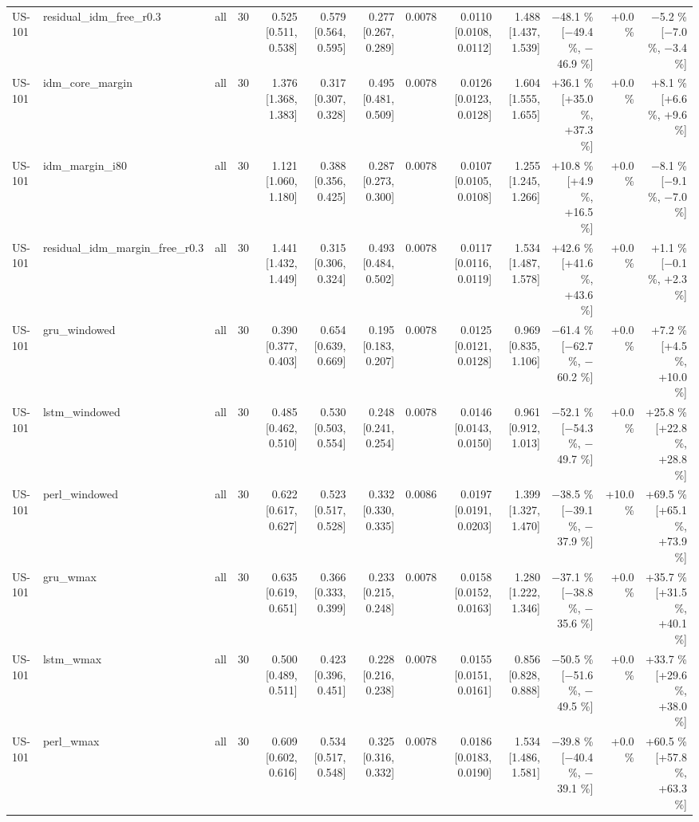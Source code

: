 \begin{table}[htbp]
{\begin{tabular}{lllrrrrrrrrrr}
US-101 & residual\_idm\_free\_r0.3 & all & 30 & 0.525 [0.511, 0.538] & 0.579 [0.564, 0.595] & 0.277 [0.267, 0.289] & 0.0078 & 0.0110 [0.0108, 0.0112] & 1.488 [1.437, 1.539] & $-$48.1 \% [$-$49.4 \%, $-$46.9 \%] & +0.0 \% & $-$5.2 \% [$-$7.0 \%, $-$3.4 \%] \\
US-101 & idm\_core\_margin & all & 30 & 1.376 [1.368, 1.383] & 0.317 [0.307, 0.328] & 0.495 [0.481, 0.509] & 0.0078 & 0.0126 [0.0123, 0.0128] & 1.604 [1.555, 1.655] & +36.1 \% [+35.0 \%, +37.3 \%] & +0.0 \% & +8.1 \% [+6.6 \%, +9.6 \%] \\
US-101 & idm\_margin\_i80 & all & 30 & 1.121 [1.060, 1.180] & 0.388 [0.356, 0.425] & 0.287 [0.273, 0.300] & 0.0078 & 0.0107 [0.0105, 0.0108] & 1.255 [1.245, 1.266] & +10.8 \% [+4.9 \%, +16.5 \%] & +0.0 \% & $-$8.1 \% [$-$9.1 \%, $-$7.0 \%] \\
US-101 & residual\_idm\_margin\_free\_r0.3 & all & 30 & 1.441 [1.432, 1.449] & 0.315 [0.306, 0.324] & 0.493 [0.484, 0.502] & 0.0078 & 0.0117 [0.0116, 0.0119] & 1.534 [1.487, 1.578] & +42.6 \% [+41.6 \%, +43.6 \%] & +0.0 \% & +1.1 \% [$-$0.1 \%, +2.3 \%] \\
US-101 & gru\_windowed & all & 30 & 0.390 [0.377, 0.403] & 0.654 [0.639, 0.669] & 0.195 [0.183, 0.207] & 0.0078 & 0.0125 [0.0121, 0.0128] & 0.969 [0.835, 1.106] & $-$61.4 \% [$-$62.7 \%, $-$60.2 \%] & +0.0 \% & +7.2 \% [+4.5 \%, +10.0 \%] \\
US-101 & lstm\_windowed & all & 30 & 0.485 [0.462, 0.510] & 0.530 [0.503, 0.554] & 0.248 [0.241, 0.254] & 0.0078 & 0.0146 [0.0143, 0.0150] & 0.961 [0.912, 1.013] & $-$52.1 \% [$-$54.3 \%, $-$49.7 \%] & +0.0 \% & +25.8 \% [+22.8 \%, +28.8 \%] \\
US-101 & perl\_windowed & all & 30 & 0.622 [0.617, 0.627] & 0.523 [0.517, 0.528] & 0.332 [0.330, 0.335] & 0.0086 & 0.0197 [0.0191, 0.0203] & 1.399 [1.327, 1.470] & $-$38.5 \% [$-$39.1 \%, $-$37.9 \%] & +10.0 \% & +69.5 \% [+65.1 \%, +73.9 \%] \\
US-101 & gru\_wmax & all & 30 & 0.635 [0.619, 0.651] & 0.366 [0.333, 0.399] & 0.233 [0.215, 0.248] & 0.0078 & 0.0158 [0.0152, 0.0163] & 1.280 [1.222, 1.346] & $-$37.1 \% [$-$38.8 \%, $-$35.6 \%] & +0.0 \% & +35.7 \% [+31.5 \%, +40.1 \%] \\
US-101 & lstm\_wmax & all & 30 & 0.500 [0.489, 0.511] & 0.423 [0.396, 0.451] & 0.228 [0.216, 0.238] & 0.0078 & 0.0155 [0.0151, 0.0161] & 0.856 [0.828, 0.888] & $-$50.5 \% [$-$51.6 \%, $-$49.5 \%] & +0.0 \% & +33.7 \% [+29.6 \%, +38.0 \%] \\
US-101 & perl\_wmax & all & 30 & 0.609 [0.602, 0.616] & 0.534 [0.517, 0.548] & 0.325 [0.316, 0.332] & 0.0078 & 0.0186 [0.0183, 0.0190] & 1.534 [1.486, 1.581] & $-$39.8 \% [$-$40.4 \%, $-$39.1 \%] & +0.0 \% & +60.5 \% [+57.8 \%, +63.3 \%] \\

\end{tabular}}
\end{table}
